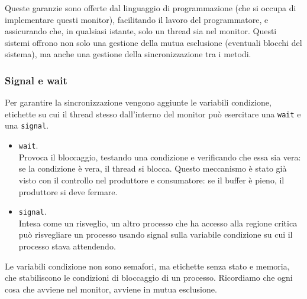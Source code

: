 \documentclass{report}
\begin{document}
Queste garanzie sono offerte dal linguaggio di programmazione (che si occupa di implementare questi monitor), facilitando il lavoro del programmatore, e assicurando che, in qualsiasi istante, solo un thread sia nel monitor.
Questi sistemi offrono non solo una gestione della mutua esclusione (eventuali blocchi del sistema), ma anche una gestione della sincronizzazione tra i metodi.

\subsubsection{Signal e wait}
 Per garantire la sincronizzazione vengono aggiunte le variabili condizione, \\etichette su cui il thread stesso dall'interno del monitor può esercitare una \verb|wait| e una \verb|signal|. 
 
 \begin{itemize}
     \item \verb|wait|.\\
     Provoca il bloccaggio, testando una condizione e verificando che essa sia vera: se la condizione è vera, il thread si blocca. Questo meccanismo è stato già visto con il controllo nel produttore e consumatore: se il buffer è pieno, il produttore si deve fermare.
     \item \verb|signal|.\\
     Intesa come un risveglio, un altro processo che ha accesso alla regione critica può risvegliare un processo usando signal sulla variabile condizione su cui il processo stava attendendo.
 \end{itemize}
Le variabili condizione non sono semafori, ma etichette senza stato e memoria, che stabiliscono le condizioni di bloccaggio di un processo.
Ricordiamo che ogni cosa che avviene nel monitor, avviene in mutua esclusione.
\end{document}
